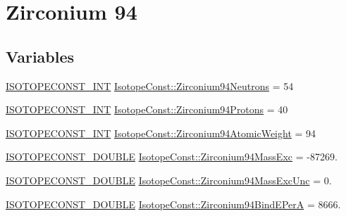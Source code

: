 \hypertarget{group___isotope_const-_zirconium-_zr94}{}\section{Zirconium 94}
\label{group___isotope_const-_zirconium-_zr94}
\subsection*{Variables}
\begin{DoxyCompactItemize}
\item 
\mbox{\hyperlink{group___isotope_const-_macros_ga5f18360b3e99483a35c32d789e62621c}{I\+S\+O\+T\+O\+P\+E\+C\+O\+N\+S\+T\+\_\+\+I\+NT}} \mbox{\hyperlink{group___isotope_const-_zirconium-_zr94_gabbd4e21ec1d7b64e7773b291482d0559}{Isotope\+Const\+::\+Zirconium94\+Neutrons}} = 54
\item 
\mbox{\hyperlink{group___isotope_const-_macros_ga5f18360b3e99483a35c32d789e62621c}{I\+S\+O\+T\+O\+P\+E\+C\+O\+N\+S\+T\+\_\+\+I\+NT}} \mbox{\hyperlink{group___isotope_const-_zirconium-_zr94_ga019ec7e9a81fb17eab5f70ee8201de2a}{Isotope\+Const\+::\+Zirconium94\+Protons}} = 40
\item 
\mbox{\hyperlink{group___isotope_const-_macros_ga5f18360b3e99483a35c32d789e62621c}{I\+S\+O\+T\+O\+P\+E\+C\+O\+N\+S\+T\+\_\+\+I\+NT}} \mbox{\hyperlink{group___isotope_const-_zirconium-_zr94_ga764c51b2348569c7d6f151027d24d3dc}{Isotope\+Const\+::\+Zirconium94\+Atomic\+Weight}} = 94
\item 
\mbox{\hyperlink{group___isotope_const-_macros_ga8f45a7272ce02c0b4c65c44636ed719a}{I\+S\+O\+T\+O\+P\+E\+C\+O\+N\+S\+T\+\_\+\+D\+O\+U\+B\+LE}} \mbox{\hyperlink{group___isotope_const-_zirconium-_zr94_gae858b6bda2e8a5965a29c058dda02691}{Isotope\+Const\+::\+Zirconium94\+Mass\+Exc}} = -\/87269.
\item 
\mbox{\hyperlink{group___isotope_const-_macros_ga8f45a7272ce02c0b4c65c44636ed719a}{I\+S\+O\+T\+O\+P\+E\+C\+O\+N\+S\+T\+\_\+\+D\+O\+U\+B\+LE}} \mbox{\hyperlink{group___isotope_const-_zirconium-_zr94_gaa9cfec01107236454d832a8c64c1fa85}{Isotope\+Const\+::\+Zirconium94\+Mass\+Exc\+Unc}} = 0.
\item 
\mbox{\hyperlink{group___isotope_const-_macros_ga8f45a7272ce02c0b4c65c44636ed719a}{I\+S\+O\+T\+O\+P\+E\+C\+O\+N\+S\+T\+\_\+\+D\+O\+U\+B\+LE}} \mbox{\hyperlink{group___isotope_const-_zirconium-_zr94_ga1617645ada80edec45dc95dff6874502}{Isotope\+Const\+::\+Zirconium94\+Bind\+E\+PerA}} = 8666.
\item 

\end{DoxyCompactItemize}
